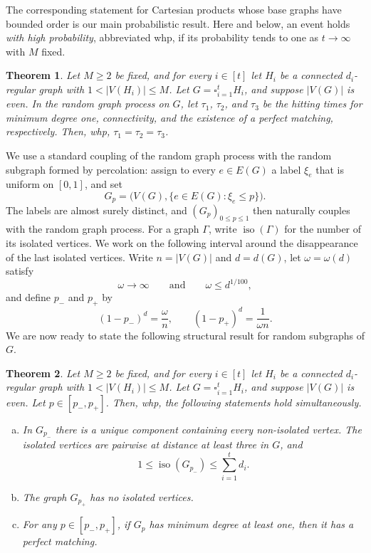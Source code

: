 \documentclass[10pt,a4paper]{article}
\newtheorem{theorem}{Theorem}
\newcommand{\whp}{whp}
\newcommand{\iso}{\operatorname{iso}}
\begin{document}
The corresponding statement for Cartesian products whose base graphs have bounded order is our main probabilistic result. Here and below, an event holds \emph{with high probability}, abbreviated \whp, if its probability tends to one as $t\to\infty$ with $M$ fixed.


\begin{theorem}\label{th:hitting-time}
Let $M\ge2$ be fixed, and for every $i\in[t]$ let $H_i$ be a connected $d_i$-regular graph with $1<|V(H_i)|\le M$.
Let $G=\square_{i=1}^tH_i$, and suppose $|V(G)|$ is even.
In the random graph process on $G$, let $\tau_1$, $\tau_2$, and $\tau_3$ be the hitting times for minimum degree one, connectivity, and the existence of a perfect matching, respectively.
Then, \whp, $  \tau_1=\tau_2=\tau_3$.
\end{theorem}


We use a standard coupling of the random graph process with the random subgraph formed by percolation: assign to every $e\in E(G)$ a label $\xi_e$ that is uniform on $[0,1]$, and set
\[
  G_p=\bigl(V(G),\{e\in E(G):\xi_e\le p\}\bigr).
\]
The labels are almost surely distinct, and $(G_p)_{0\le p\le1}$ then naturally couples with the random graph process.
%
For a graph $\Gamma$, write $\iso(\Gamma)$ for the number of its isolated vertices.
We work on the following interval around the disappearance of the last isolated vertices.
Write $n=|V(G)|$ and $d=d(G)$, let $\omega=\omega(d)$ satisfy
\[
  \omega\to \infty
  \qquad\text{and}\qquad
  \omega\le d^{1/100},
\]
and define $p_-$ and $p_+$ by
\begin{equation}\label{eq:window}
  (1-p_-)^d=\frac{\omega}{n},
  \qquad
  (1-p_+)^d=\frac{1}{\omega n}.
\end{equation}
We are now ready to state the following structural result for random subgraphs of $G$.
\begin{theorem}\label{th:window-connectivity}
Let $M\ge2$ be fixed, and for every $i\in[t]$ let $H_i$ be a connected $d_i$-regular graph with $1<|V(H_i)|\le M$.
Let $G=\square_{i=1}^tH_i$, and suppose $|V(G)|$ is even. Let $p \in [p_-, p_+]$.  Then, \whp, the following statements hold simultaneously.
\begin{enumerate}[(a)]
  \item In $G_{p_-}$ there is a unique component containing every non-isolated vertex. The isolated vertices are pairwise at distance at least three in $G$, and
  \[
    1\le \iso(G_{p_-})\le \sum_{i=1}^td_i.
  \]
  \item The graph $G_{p_+}$ has no isolated vertices.
  \item For any $p\in [p_-, p_+]$, if $G_p$ has minimum degree at least one, then it has a perfect matching. 
\end{enumerate}
\end{theorem}
\end{document}
